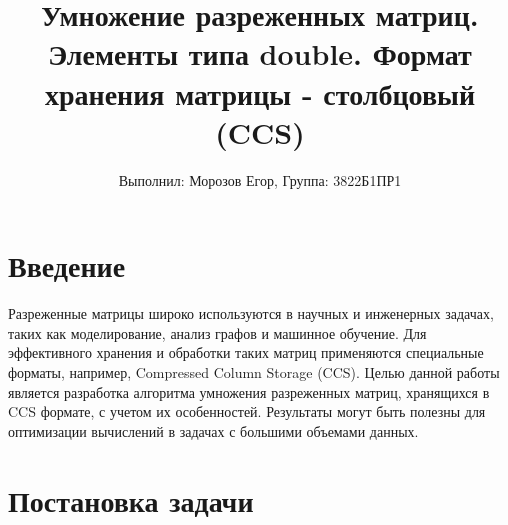 \documentclass[a4paper,12pt]{article}
\title{Умножение разреженных матриц. Элементы типа double. Формат хранения матрицы - столбцовый (CCS)}
\author{Выполнил: Морозов Егор, 
Группа: 3822Б1ПР1}
\begin{document}
\maketitle
    
\tableofcontents
\newpage
\section{Введение}

Разреженные матрицы широко используются в научных и инженерных задачах, таких как моделирование, анализ графов и машинное обучение. Для эффективного хранения и обработки таких матриц применяются специальные форматы, например, Compressed Column Storage (CCS). Целью данной работы является разработка алгоритма умножения разреженных матриц, хранящихся в CCS формате, с учетом их особенностей. Результаты могут быть полезны для оптимизации вычислений в задачах с большими объемами данных.

\section{Постановка задачи}
\end{document}
